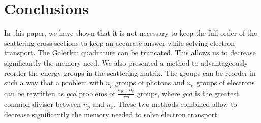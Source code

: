\section{Conclusions}
In this paper, we have shown that it is not necessary to keep the full order of
the scattering cross sections to keep an accurate answer while solving
electron transport. The Galerkin quadrature can be truncated. This allows us to
decrease significantly the memory need. We also presented a method to
advantageously reorder the energy groups in the scattering matrix. The groups can 
be reorder in such a way that a problem with $n_p$ groups of photons and $n_e$ 
groups of electrons can be rewritten as $gcd$ problems of $\frac{n_p+n_e}{gcd}$ 
groups, where $gcd$ is the greatest common divisor between $n_p$ and $n_e$. 
These two methods combined allow to decrease significantly the memory needed to 
solve electron transport.
